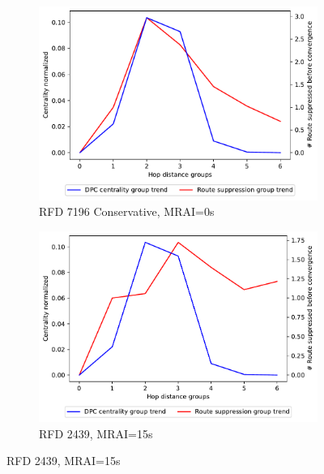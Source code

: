 \begin{figure}[H]
\begin{subfigure}[b]{0.325\textwidth}
     \end{subfigure}
     \hfill
     \begin{subfigure}[b]{0.325\textwidth}
         \centering
         \includegraphics[width=\textwidth]{images/RFD/miceVSelephants/MultiMRAI/0/elephants/cisco_1000_RFD_7196_conservative_nodeConvergence_centVSsup_trend.pdf}
         \caption{\scriptsize RFD 7196 Conservative, MRAI=0s}
         \label{fig:1000_7196RFDC_centVSsup_elephants_MRAI0}
     \end{subfigure}
     \vfill
     \begin{subfigure}[b]{0.325\textwidth}
         \centering
         \includegraphics[width=\textwidth]{images/RFD/miceVSelephants/MultiMRAI/15/elephants/cisco_1000_RFD_nodeConvergence_centVSsup_trend.pdf}
         \caption{\scriptsize RFD 2439, MRAI=15s}
         \label{fig:1000_2439RFD_centVSsup_elephants_MRAI15}

\end{subfigure}
\end{figure}
